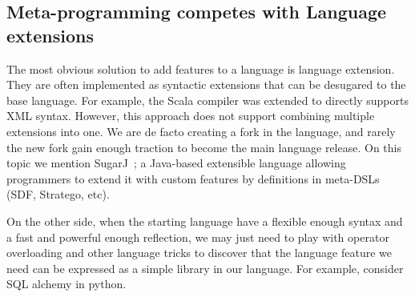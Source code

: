 \begin{comment}
\subsection{Type-Directed Translations/Syntactic Sugar}
\marco{I'm tring to merge this and the next one}
Language extensions are often implemented as syntactic sugar of the base
language. For example, Scala compiler supports XML syntax in normal Scala code
directly (after Scala ?, users need to import \texttt{scala-xml} library
manually). However, this approach is hard in terms of implementation, because it
requires extending the compiler. Also, this approach does not support combining
multiple extensions into one.

SugarJ~\cite{erdweg11sugarj} is a Java-based extensible programming language
that allows programmers to extend the base language with custom language
features by definitions in meta-DSLs (SDF, Stratego, etc). 
\yanlin{Is new syntax really a ``drawback''? I think for some system, like
  SugarJ, one of purpose IS to introduce these new syntax.}  Drawbacks: new
syntax. To create the extension, programmers have to work with multiple
languages (SDF, stratego, etc) while our approach works totally in Java
environment.

We can model certain types of language extensions with annotations 
only, but those extensions do not introduce new syntax: they 
merely do automatic code generation. 
\end{comment}
\subsection{Meta-programming competes with Language extensions}
The most obvious solution to add features to a language is language extension.
They are often implemented as syntactic extensions that can be desugared to the base
language. For example, the Scala compiler was extended to directly supports XML syntax. However, this approach does not support combining multiple extensions into one. We are de facto creating a fork in the language, and rarely the new fork gain enough traction to become the main language release.
On this topic we mention SugarJ~\cite{erdweg11sugarj}; a Java-based extensible language allowing programmers to extend it with custom features by definitions in meta-DSLs (SDF, Stratego, etc). 

On the other side, when the starting language have a flexible enough syntax and a fast and powerful enough reflection, we may just need to play with operator overloading and other language tricks to discover that the language feature we need can be expressed as a simple library in our language. For example, consider SQL alchemy in python.

